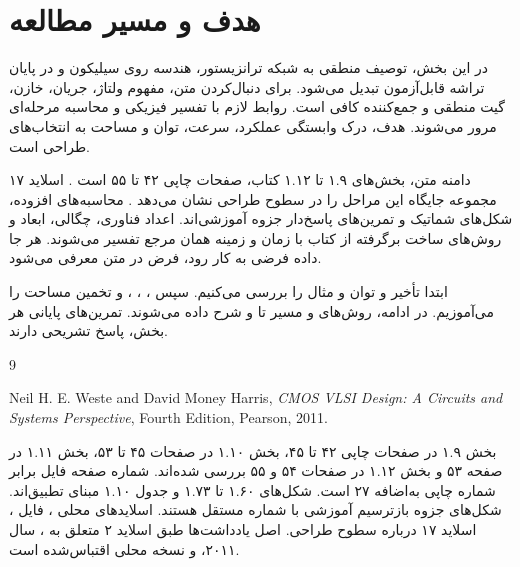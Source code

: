 \documentclass[12pt,a4paper]{article}
\newcommand{\secnum}[1]{\mbox{\beginL#1\endL}}
\begin{document}
\MakeAssignmentCover
\section*{هدف و مسیر مطالعه}
در این بخش، توصیف منطقی به شبکه ترانزیستور، هندسه روی سیلیکون و در پایان
تراشه قابل‌آزمون تبدیل می‌شود. برای دنبال‌کردن متن، مفهوم ولتاژ، جریان، خازن،
گیت منطقی و جمع‌کننده کافی است. روابط لازم با تفسیر فیزیکی و محاسبه مرحله‌ای مرور می‌شوند.
هدف، درک وابستگی عملکرد، سرعت، توان و مساحت به انتخاب‌های طراحی است.

دامنه متن، بخش‌های \secnum{۱.۹} تا \secnum{۱.۱۲} کتاب، صفحات چاپی ۴۲ تا ۵۵ است
\cite{weste}. اسلاید ۱۷ مجموعه  جایگاه این مراحل را در سطوح طراحی نشان می‌دهد
\cite{intro}. محاسبه‌های افزوده، شکل‌های شماتیک و تمرین‌های پاسخ‌دار جزوه آموزشی‌اند.
اعداد فناوری، چگالی، ابعاد و روش‌های ساخت برگرفته از کتاب با زمان و زمینه همان مرجع تفسیر می‌شوند.
هر جا داده فرضی به کار رود، فرض در متن معرفی می‌شود.

ابتدا تأخیر و توان و مثال  را بررسی می‌کنیم. سپس ،
، ،  و تخمین مساحت را می‌آموزیم.
در ادامه، روش‌های  و مسیر  تا  و 
شرح داده می‌شوند. تمرین‌های پایانی هر بخش، پاسخ تشریحی دارند.
\tableofcontents
\clearpage




\begin{thebibliography}{9}
\begin{latin}
Neil H. E. Weste and David Money Harris,
\textit{CMOS VLSI Design: A Circuits and Systems Perspective},
Fourth Edition, Pearson, 2011.
\end{latin}
بخش \secnum{۱.۹} در صفحات چاپی ۴۲ تا ۴۵، بخش \secnum{۱.۱۰} در صفحات ۴۵ تا ۵۳،
بخش \secnum{۱.۱۱} در صفحه ۵۳ و بخش \secnum{۱.۱۲} در صفحات ۵۴ و ۵۵ بررسی شده‌اند.
شماره صفحه فایل  برابر شماره چاپی به‌اضافه ۲۷ است.
شکل‌های \secnum{۱.۶۰} تا \secnum{۱.۷۳} و جدول \secnum{۱.۱۰} مبنای تطبیق‌اند.
شکل‌های جزوه بازترسیم آموزشی با شماره مستقل هستند.
اسلایدهای محلی ، فایل ، اسلاید ۱۷ درباره سطوح طراحی.
اصل یادداشت‌ها طبق اسلاید ۲ متعلق به ، سال ۲۰۱۱، و نسخه محلی اقتباس‌شده است.
\end{thebibliography}
\end{document}
